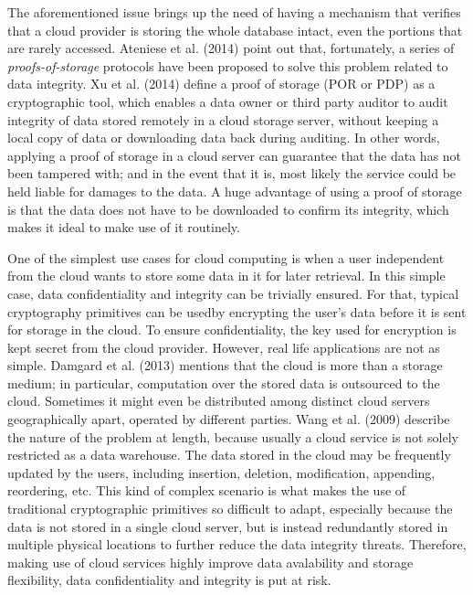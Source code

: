 The aforementioned issue brings up the need of having a mechanism that verifies that a cloud provider is storing the whole database intact, even the portions that are rarely accessed. Ateniese et al. (2014) \cite{cryptoeprint:2014:886} point out that, fortunately, a series of \textit{proofs-of-storage} protocols have been proposed to solve this problem related to data integrity. Xu et al. (2014) \cite{cryptoeprint:2014:395} define a proof of storage (POR or PDP) as a cryptographic tool, which enables a data owner or third party auditor to audit integrity of data stored remotely in a cloud storage server, without keeping a local copy of data or downloading data back during auditing. In other words, applying a proof of storage in a cloud server can guarantee that the data has not been tampered with; and in the event that it is, most likely the service could be held liable for damages to the data. A huge advantage of using a proof of storage is that the data does not have to be downloaded to confirm its integrity, which makes it ideal to make use of it routinely. 

One of the simplest use cases for cloud computing is when a user independent from the cloud wants to store some data in it for later retrieval. In this simple case, data confidentiality and integrity can be trivially ensured. For that, typical cryptography primitives can be usedby encrypting the user's data before it is sent for storage in the cloud. To ensure confidentiality, the key used for encryption is kept secret from the cloud provider. However, real life applications are not as simple. Damgard et al. (2013) \cite{cryptoeprint:2013:629} mentions that the cloud is more than a storage medium; in particular, computation over the stored data is outsourced to the cloud. Sometimes it might even be distributed among distinct cloud servers geographically apart, operated by different parties. Wang et al. (2009) \cite{cryptoeprint:2009:081} describe the nature of the problem at length, because usually a cloud service is not solely restricted as a data warehouse. The data stored in the cloud may be frequently updated by the users, including insertion, deletion, modification, appending, reordering, etc. This kind of complex scenario is what makes the use of traditional cryptographic primitives so difficult to adapt, especially because the data is not stored in a single cloud server, but is instead redundantly stored in multiple physical locations to further reduce the data integrity threats. Therefore, making use of cloud services highly improve data avalability and storage flexibility, data confidentiality and integrity is put at risk.

